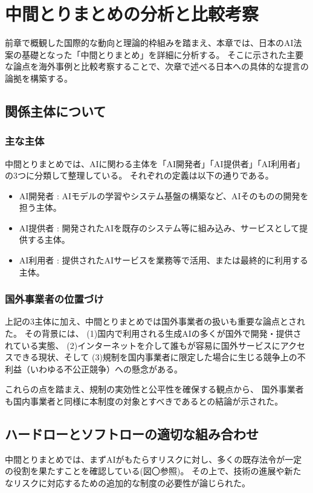 \chapter{中間とりまとめの分析と比較考察}
前章で概観した国際的な動向と理論的枠組みを踏まえ、本章では、日本のAI法案の基礎となった「中間とりまとめ」を詳細に分析する。
そこに示された主要な論点を海外事例と比較考察することで、次章で述べる日本への具体的な提言の論拠を構築する。

\section{関係主体について}

\subsection{主な主体}
中間とりまとめでは、AIに関わる主体を「AI開発者」「AI提供者」「AI利用者」の3つに分類して整理している。
それぞれの定義は以下の通りである。

\begin{itemize}
  \item AI開発者 : AIモデルの学習やシステム基盤の構築など、AIそのものの開発を担う主体。
  \item AI提供者 : 開発されたAIを既存のシステム等に組み込み、サービスとして提供する主体。
  \item AI利用者 : 提供されたAIサービスを業務等で活用、または最終的に利用する主体。
\end{itemize}

\subsection{国外事業者の位置づけ}
上記の3主体に加え、中間とりまとめでは国外事業者の扱いも重要な論点とされた。
その背景には、
(1)国内で利用される生成AIの多くが国外で開発・提供されている実態、
(2)インターネットを介して誰もが容易に国外サービスにアクセスできる現状、そして
(3)規制を国内事業者に限定した場合に生じる競争上の不利益（いわゆる不公正競争）への懸念がある。

これらの点を踏まえ、規制の実効性と公平性を確保する観点から、
国外事業者も国内事業者と同様に本制度の対象とすべきであるとの結論が示された。


\section{ハードローとソフトローの適切な組み合わせ}
中間とりまとめでは、まずAIがもたらすリスクに対し、多くの既存法令が一定の役割を果たすことを確認している(図〇参照)。
その上で、技術の進展や新たなリスクに対応するための追加的な制度の必要性が論じられた。

